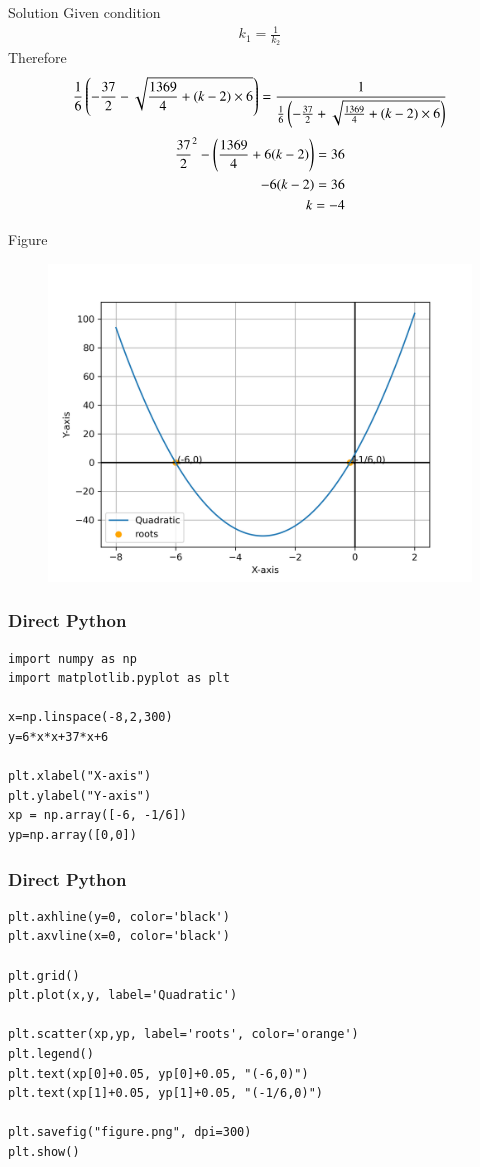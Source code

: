 \documentclass{beamer}
\begin{document}
\begin{frame}{Solution}
Given condition
\begin{align}
    k_1=\frac{1}{k_2}
\end{align}
Therefore
\begin{align}
    \frac{1}{6}\left(-\frac{37}{2} - \sqrt{\frac{1369}{4} +(k-2)\times 6}\right)=\frac{1}{\frac{1}{6}\left(-\frac{37}{2} + \sqrt{\frac{1369}{4} +(k-2)\times 6}\right)}
\end{align}
\begin{align}
    \frac{37}{2}^2-\left(\frac{1369}{4}+6(k-2)\right)=36\\
    -6(k-2)=36\\
    k=-4
\end{align}
\end{frame}

\begin{frame}{Figure}
    \begin{figure}[H]
        \centering
        \includegraphics[width=0.9\columnwidth]{figs/figure.png}
        \caption{}
        \label{fig:placeholder}
    \end{figure}
\end{frame}
\begin{frame}[fragile]
\frametitle{Direct Python}
\begin{lstlisting}
import numpy as np
import matplotlib.pyplot as plt

x=np.linspace(-8,2,300)
y=6*x*x+37*x+6

plt.xlabel("X-axis")
plt.ylabel("Y-axis")
xp = np.array([-6, -1/6])
yp=np.array([0,0])
\end{lstlisting}
\end{frame}
\begin{frame}[fragile]
\frametitle{Direct Python}
\begin{lstlisting}
plt.axhline(y=0, color='black')
plt.axvline(x=0, color='black')

plt.grid()
plt.plot(x,y, label='Quadratic')

plt.scatter(xp,yp, label='roots', color='orange')
plt.legend()
plt.text(xp[0]+0.05, yp[0]+0.05, "(-6,0)")
plt.text(xp[1]+0.05, yp[1]+0.05, "(-1/6,0)")

plt.savefig("figure.png", dpi=300)
plt.show()
\end{lstlisting}
\end{frame}
\end{document}

